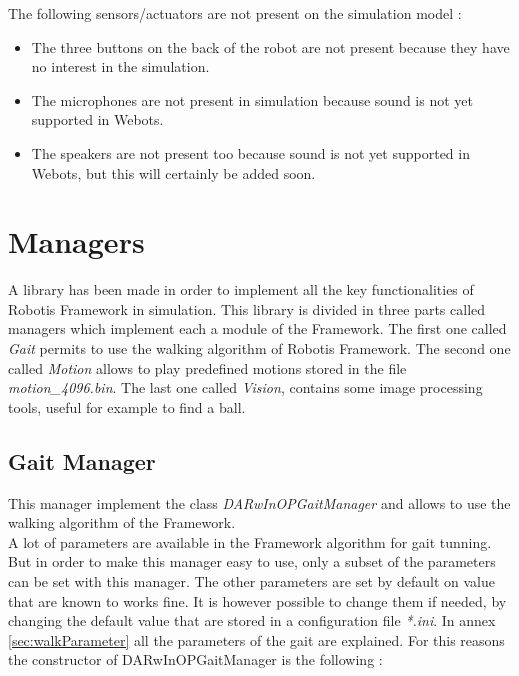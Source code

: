 \documentclass[a4paper, 12pt]{article}  		%
\begin{document}
The following sensors/actuators are not present on the simulation model :
\begin{itemize}
\item The three buttons on the back of the robot are not present because they have no interest in the simulation.
\item The microphones are not present in simulation because sound is not yet supported in Webots.
\item The speakers are not present too because sound is not yet supported in Webots, but this will certainly be added soon. 
\end{itemize}


\newpage
\section{Managers}

A library has been made in order to implement all the key functionalities of Robotis Framework in simulation. This library is divided in three parts called managers which implement each a module of the Framework. The first one called \textit{Gait} permits to use the walking algorithm of Robotis Framework. The second one called \textit{Motion} allows to play predefined motions stored in the file \textit{motion\_4096.bin}. The last one called \textit{Vision}, contains some image processing tools, useful for example to find a ball.\\

\subsection{Gait Manager}
This manager implement the class \textit{DARwInOPGaitManager} and allows to use the walking algorithm of the Framework.\\

A lot of parameters are available in the Framework algorithm for gait tunning. But in order to make this manager easy to use, only a subset of the parameters can be set with this manager. The other parameters are set by default on value that are known to works fine. It is however possible to change them if needed, by changing the default value that are stored in a configuration file \textit{*.ini}. In annex \ref{sec:walkParameter} all the parameters of the gait are explained. For this reasons the constructor of DARwInOPGaitManager is the following :\\
\end{document}
